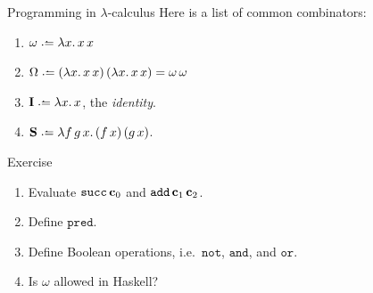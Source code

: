 \begin{frame}[allowframebreaks]{Programming in $\lambda$-calculus}
  Here is a list of common combinators:
\begin{enumerate}
  \item $\omega \defeq \lambda x.\, x\,x$
  \item $\Omega \defeq (\lambda x.\, x\,x)\,(\lambda x.\,x\,x)
    = \omega\,\omega$
  \item $\mathbf{I} \defeq \lambda x.\, x$, the \emph{identity}.
  \item $\mathbf{S}\defeq\lambda f\,g\,x.\, 
    (f\,x)\,(g\,x)$.
\end{enumerate}
  \begin{block}{Exercise}
    \begin{enumerate}
      \item Evaluate $\mathtt{succ}\,\mathbf{c}_0$ and $\mathtt{add}\,\mathbf{c}_{1}\,\mathbf{c}_{2}$. 
      \item Define $\mathtt{pred}$. 
      \item Define Boolean operations, i.e.\ $\mathtt{not}$, $\mathtt{and}$,
        and $\mathtt{or}$. 
      \item Is $\omega$ allowed in Haskell? 
    \end{enumerate}
  \end{block}
\end{frame}

